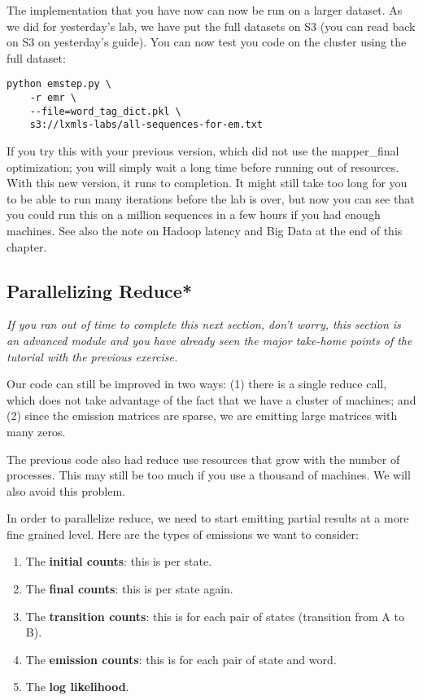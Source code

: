 The implementation that you have now can now be run on a larger dataset. As we
did for yesterday's lab, we have put the full datasets on S3 (you can read back
on S3 on yesterday's guide). You can now test you code on the cluster using the
full dataset:

\begin{verbatim}
python emstep.py \
    -r emr \
    --file=word_tag_dict.pkl \
    s3://lxmls-labs/all-sequences-for-em.txt
\end{verbatim}

If you try this with your previous version, which did not use the mapper\_final
optimization; you will simply wait a long time before running out of
resources. With this new version, it runs to completion. It might still take
too long for you to be able to run many iterations before the lab is over, but
now you can see that you could run this on a million sequences in a few hours
if you had enough machines. See also the note on Hadoop latency and Big Data at the
end of this chapter.

\subsection{Parallelizing Reduce*}

\emph{If you ran out of time to complete this next section, don't worry, this
section is an advanced module and you have already seen the major take-home
points of the tutorial with the previous exercise.}

Our code can still be improved in two ways: (1) there is a single reduce call,
which does not take advantage of the fact that we have a cluster of machines;
and (2) since the emission matrices are sparse, we are emitting large matrices
with many zeros. %

The previous code also had reduce use resources that grow with the number of
processes. This may still be too much if you use a thousand of machines. We
will also avoid this problem.

In order to parallelize reduce, we need to start emitting partial results at a
more fine grained level. Here are the types of emissions we want to consider:

\begin{enumerate}
\item The \textbf{initial counts}: this is per state.
\item The \textbf{final counts}: this is per state again.
\item The \textbf{transition counts}: this is for each pair of states (transition from A to B).
\item The \textbf{emission counts}: this is for each pair of state and word.
\item The \textbf{log likelihood}.
\end{enumerate}

